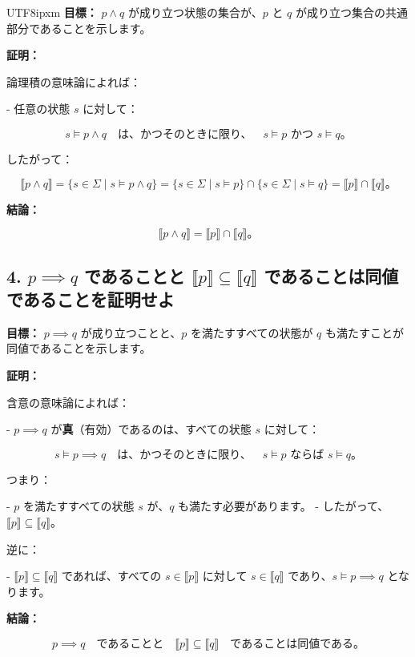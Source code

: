 \documentclass[12pt,a4paper]{article}
\begin{document}
\begin{CJK}{UTF8}{ipxm}
\textbf{目標：} \( p \land q \) が成り立つ状態の集合が、\( p \) と \( q \) が成り立つ集合の共通部分であることを示します。

\textbf{証明：}

論理積の意味論によれば：

- 任意の状態 \( s \) に対して：

  \[
  s \models p \land q \quad \text{は、かつそのときに限り、} \quad s \models p \text{ かつ } s \models q。
  \]

したがって：

\[
\llbracket p \land q \rrbracket = \{ s \in \Sigma \mid s \models p \land q \} = \{ s \in \Sigma \mid s \models p \} \cap \{ s \in \Sigma \mid s \models q \} = \llbracket p \rrbracket \cap \llbracket q \rrbracket。
\]

\textbf{結論：}

\[
\llbracket p \land q \rrbracket = \llbracket p \rrbracket \cap \llbracket q \rrbracket。
\]

\subsection*{4. \( p \implies q \) であることと \( \llbracket p \rrbracket \subseteq \llbracket q \rrbracket \) であることは同値であることを証明せよ}

\textbf{目標：} \( p \implies q \) が成り立つことと、\( p \) を満たすすべての状態が \( q \) も満たすことが同値であることを示します。

\textbf{証明：}

含意の意味論によれば：

- \( p \implies q \) が\textbf{真}（有効）であるのは、すべての状態 \( s \) に対して：

  \[
  s \models p \implies q \quad \text{は、かつそのときに限り、} \quad s \models p \text{ ならば } s \models q。
  \]

つまり：

- \( p \) を満たすすべての状態 \( s \) が、\( q \) も満たす必要があります。
- したがって、\( \llbracket p \rrbracket \subseteq \llbracket q \rrbracket \)。

逆に：

- \( \llbracket p \rrbracket \subseteq \llbracket q \rrbracket \) であれば、すべての \( s \in \llbracket p \rrbracket \) に対して \( s \in \llbracket q \rrbracket \) であり、\( s \models p \implies q \) となります。

\textbf{結論：}

\[
p \implies q \quad \text{であることと} \quad \llbracket p \rrbracket \subseteq \llbracket q \rrbracket \quad \text{であることは同値である。}
\]


\end{CJK}
\end{document}
